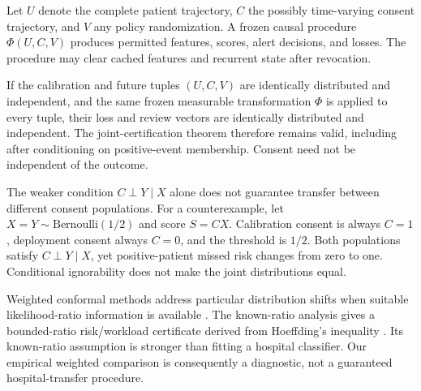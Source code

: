 Let $U$ denote the complete patient trajectory, $C$ the possibly time-varying consent trajectory, and $V$ any policy randomization. A frozen causal procedure $\Phi(U,C,V)$ produces permitted features, scores, alert decisions, and losses. The procedure may clear cached features and recurrent state after revocation.

\begin{proposition}
If the calibration and future tuples $(U,C,V)$ are identically distributed and independent, and the same frozen measurable transformation $\Phi$ is applied to every tuple, their loss and review vectors are identically distributed and independent. The joint-certification theorem therefore remains valid, including after conditioning on positive-event membership. Consent need not be independent of the outcome.
\end{proposition}
The weaker condition $C\perp Y\mid X$ alone does not guarantee transfer between different consent populations. For a counterexample, let $X=Y\sim\mathrm{Bernoulli}(1/2)$ and score $S=CX$. Calibration consent is always $C=1$, deployment consent always $C=0$, and the threshold is $1/2$. Both populations satisfy $C\perp Y\mid X$, yet positive-patient missed risk changes from zero to one. Conditional ignorability does not make the joint distributions equal.

Weighted conformal methods address particular distribution shifts when suitable likelihood-ratio information is available \citep{weighted}. The known-ratio analysis gives a bounded-ratio risk/workload certificate derived from Hoeffding's inequality \citep{hoeffding}. Its known-ratio assumption is stronger than fitting a hospital classifier. Our empirical weighted comparison is consequently a diagnostic, not a guaranteed hospital-transfer procedure.

